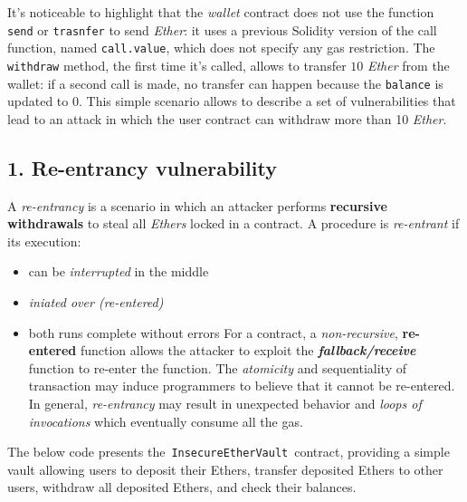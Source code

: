 \documentclass[10pt,a4paper]{report}
\begin{document}
It's noticeable to highlight that the \textit{wallet} contract does not use the function \texttt{send} or \texttt{trasnfer} to send \textit{Ether}: it uses a previous Solidity version of the call function, named \texttt{call.value}, which does not specify any gas restriction.
The \texttt{withdraw} method, the first time it's called, allows to transfer $10$ \textit{Ether} from the wallet: if a second call is made, no transfer can happen because the \texttt{balance} is updated to $0$.
This simple scenario allows to describe a set of vulnerabilities that lead to an attack in which the user contract can withdraw more than 10 \textit{Ether}.
\subsection{1. Re-entrancy vulnerability}\label{sec:1-re-entrancy-vulnerability}
A \textit{re-entrancy} is a scenario in which an attacker performs \textbf{recursive withdrawals} to steal all \textit{Ethers} locked in a contract. A procedure is \textit{re-entrant} if its execution:
\begin{itemize}
	\item 
	can be \textit{interrupted} in the middle
	\item 
	\textit{iniated over (re-entered)}
	\item 
	both runs complete without errors
	For a contract, a \textit{non-recursive}, \textbf{re-entered} function allows the attacker to exploit the \textit{\textbf{fallback/receive}} function to re-enter the function. The \textit{atomicity} and sequentiality of transaction may induce programmers to believe that it cannot be re-entered.
	In general, \textit{re-entrancy} may result in unexpected behavior and \textit{loops of invocations} which eventually consume all the gas.
\end{itemize}

The below code presents the \texttt{InsecureEtherVault} contract, providing a simple vault allowing users to deposit their Ethers, transfer deposited Ethers to other users, withdraw all deposited Ethers, and check their balances.
\end{document}
